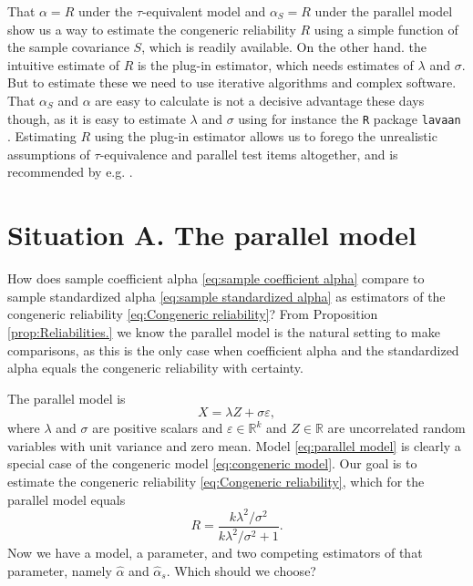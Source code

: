 \documentclass[twoside]{article}
\begin{document}
That $\alpha = R$ under the $\tau$-equivalent model and $\alpha_S = R$ under the parallel model show us a way to estimate the congeneric reliability $R$ using a simple function of the sample covariance $S$, which is readily available. On the other hand. the intuitive estimate of $R$ is the plug-in estimator, which needs estimates of $\lambda$ and $\sigma$. But to estimate these we need to use iterative algorithms and complex software. That $\alpha_S$ and $\alpha$ are easy to calculate is not a decisive advantage these days though, as it is easy to estimate $\lambda$ and $\sigma$ using for instance the \texttt{R} \citep{Team2013-tt} package \texttt{lavaan} \citep{Rosseel2012-yg}. Estimating $R$ using the plug-in estimator allows us to forego the unrealistic assumptions of $\tau$-equivalence and parallel test items altogether, and is recommended by e.g. \citet{McNeish2019-ea}.

\section{Situation A. The parallel model}
\label{sec:argument A}

How does sample coefficient alpha \eqref{eq:sample coefficient alpha} compare to sample standardized alpha \eqref{eq:sample standardized alpha} as estimators of the congeneric reliability \eqref{eq:Congeneric reliability}? From Proposition \ref{prop:Reliabilities.} we know the parallel model is the natural setting to make comparisons, as this is the only case when coefficient alpha and the standardized alpha equals the congeneric reliability with certainty.

The parallel model is
\begin{equation}
\label{eq:parallel model}
X = \lambda Z + \sigma\varepsilon,
\end{equation}
where $\lambda$ and $\sigma$ are positive scalars and $\varepsilon\in\mathbb{R}^k$ and $Z\in\mathbb{R}$ are uncorrelated random variables with unit variance and zero mean. Model \eqref{eq:parallel model} is clearly a special case of the congeneric model \eqref{eq:congeneric model}. Our goal is to estimate the congeneric reliability \eqref{eq:Congeneric reliability}, which for the parallel model equals
\begin{equation}
\label{eq:parallel_omega}
 R = \frac{k\lambda^2/\sigma^2}{k\lambda^2/\sigma^2 + 1}.
\end{equation}
Now we have a model, a parameter, and two competing estimators of that parameter, namely $\hat{\alpha}$ and $\hat{\alpha}_s$. Which should we choose? 
\end{document}

